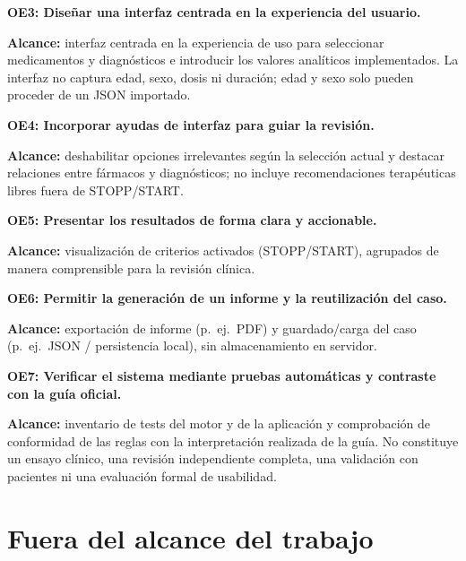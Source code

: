 \medskip
\noindent\textbf{OE3: Diseñar una interfaz centrada en la experiencia del
usuario.}

\textbf{Alcance:} interfaz centrada en la experiencia de uso para seleccionar
medicamentos y diagnósticos e introducir los valores analíticos
implementados. La interfaz no captura edad, sexo, dosis ni duración; edad y
sexo solo pueden proceder de un JSON importado.

\medskip
\noindent\textbf{OE4: Incorporar ayudas de interfaz para guiar la revisión.}

\textbf{Alcance:} deshabilitar opciones irrelevantes según la selección actual
y destacar relaciones entre fármacos y diagnósticos; no incluye
recomendaciones terapéuticas libres fuera de STOPP/START.

\medskip
\noindent\textbf{OE5: Presentar los resultados de forma clara y accionable.}

\textbf{Alcance:} visualización de criterios activados (STOPP/START), agrupados
de manera comprensible para la revisión clínica.

\medskip
\noindent\textbf{OE6: Permitir la generación de un informe y la reutilización
del caso.}

\textbf{Alcance:} exportación de informe (p.~ej.\ PDF) y guardado/carga del
caso (p.~ej.\ JSON / persistencia local), sin almacenamiento en servidor.

\medskip
\noindent\textbf{OE7: Verificar el sistema mediante pruebas automáticas y
contraste con la guía oficial.}

\textbf{Alcance:} inventario de tests del motor y de la aplicación y
comprobación de conformidad de las reglas con la interpretación realizada de
la guía. No constituye un ensayo clínico, una revisión independiente completa,
una validación con pacientes ni una evaluación formal de usabilidad.

\section{Fuera del alcance del trabajo}

